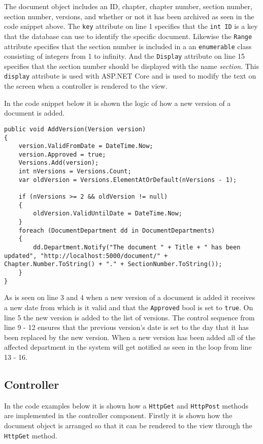 The document object includes an ID, chapter, chapter number, section number, section number, versions, and whether or not it has been archived as seen in the code snippet above.
The \texttt{key} attribute on line 1 specifies that the \texttt{int ID} is a key that the database can use to identify the specific document.
Likewise the \texttt{Range} attribute specifies that the section number is included in a an \texttt{enumerable} class consisting of integers from 1 to infinity.
And the \texttt{Display} attribute on line 15 specifies that the section number should be displayed with the name \textit{section}.
This \texttt{display} attribute is used with ASP.NET Core and is used to modify the text on the screen when a controller is rendered to the view.

In the code snippet below it is shown the logic of how a new version of a document is added.
\\

\begin{lstlisting}[caption={Document Model: AddVersion}, label={lst:addversion}]
public void AddVersion(Version version)
{
	version.ValidFromDate = DateTime.Now;
	version.Approved = true;
	Versions.Add(version);
	int nVersions = Versions.Count;
	var oldVersion = Versions.ElementAtOrDefault(nVersions - 1);

	if (nVersions >= 2 && oldVersion != null)
	{
		oldVersion.ValidUntilDate = DateTime.Now;
	}
	foreach (DocumentDepartment dd in DocumentDepartments)
	{
		dd.Department.Notify("The document " + Title + " has been updated", "http://localhost:5000/document/" + Chapter.Number.ToString() + "." + SectionNumber.ToString());
	}
}
\end{lstlisting}

As is seen on line 3 and 4 when a new version of a document is added it receives a new date from which is it valid and that the \texttt{Approved} bool is set to \texttt{true}.
On line 5 the new version is added to the list of versions.
The control sequence from line 9 - 12 ensures that the previous version's date is set to the day that it has been replaced by the new version.
When a new version has been added all of the affected department in the system will get notified as seen in the loop from line 13 - 16.

\subsection{Controller}

In the code examples below it is shown how a \texttt{HttpGet} and \texttt{HttpPost} methods are implemented in the controller component.
Firstly it is shown how the document object is arranged so that it can be rendered to the view through the \texttt{HttpGet} method.
\\


